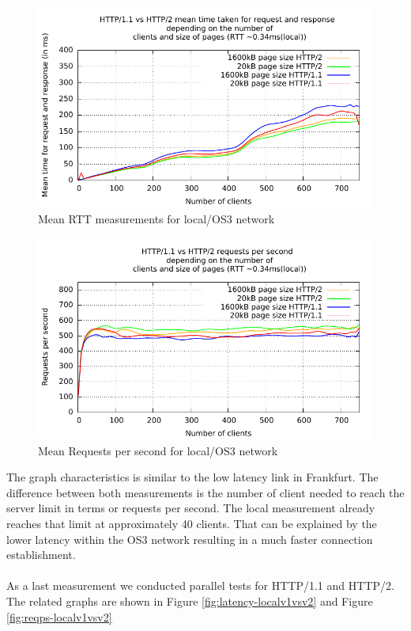 \begin{figure}[H]
	\centering
	\includegraphics[scale=1,trim=0.0cm .0cm .0cm .0cm,clip]{images/latency-local.pdf}
	\caption{Mean RTT measurements for local/OS3 network}
	\label{fig:latency-local}
\end{figure}

\begin{figure}[H]
	\centering
	\includegraphics[scale=1,trim=0.0cm .0cm .0cm .0cm,clip]{images/reqps-local.pdf}
	\caption{Mean Requests per second for local/OS3 network}
	\label{fig:reqps-local}
\end{figure}

The graph characteristics is similar to the low latency link in Frankfurt. The difference between both measurements is the number of client needed to reach the server limit in terms or requests per second. The local measurement already reaches that limit at approximately 40 clients. That can be explained by the lower latency within the OS3 network resulting in a much faster connection establishment.
\\
\\
As a last measurement we conducted parallel tests for HTTP/1.1 and HTTP/2. The related graphs are shown in Figure \ref{fig:latency-localv1vsv2} and Figure \ref{fig:reqps-localv1vsv2}

